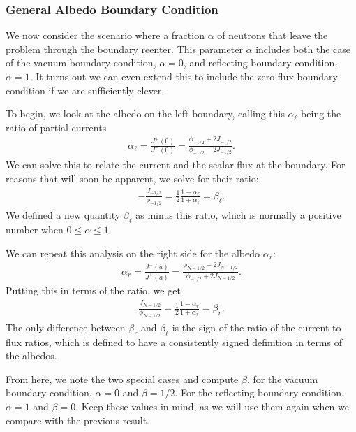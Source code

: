 \subsubsection{General Albedo Boundary Condition}

We now consider the scenario where a fraction $\alpha$ of neutrons that leave the problem through the boundary reenter. This parameter $\alpha$ includes both the case of the vacuum boundary condition, $\alpha = 0$, and reflecting boundary condition, $\alpha = 1$. It turns out we can even extend this to include the zero-flux boundary condition if we are sufficiently clever. 

To begin, we look at the albedo on the left boundary, calling this $\alpha_\ell$ being the ratio of partial currents
\begin{align}
  \alpha_\ell = \frac{ J^+(0) }{ J^-(0) } = \frac{ \phi_{-1/2} + 2 J_{-1/2} }{ \phi_{-1/2} - 2 J_{-1/2} } .
\end{align}
We can solve this to relate the current and the scalar flux at the boundary. For reasons that will soon be apparent, we solve for their ratio:
\begin{align}
  -\frac{J_{-1/2}}{\phi_{-1/2}} = \frac{1}{2} \frac{ 1 - \alpha_\ell }{ 1 + \alpha_\ell } = \beta_\ell . \label{Eq:neutronics_albedoBeta_FiniteDifferenceLeft}
\end{align}
We defined a new quantity $\beta_\ell$ as minus this ratio, which is normally a positive number when $0 \le \alpha \le 1$. 

We can repeat this analysis on the right side for the albedo $\alpha_r$:
\begin{align}
  \alpha_r = \frac{ J^-(a) }{ J^+(a) } = \frac{ \phi_{N-1/2} - 2 J_{N-1/2} }{ \phi_{-1/2} + 2 J_{N-1/2} } .
\end{align}
Putting this in terms of the ratio, we get
\begin{align}
  \frac{J_{N-1/2}}{\phi_{N-1/2}} = \frac{1}{2} \frac{ 1 - \alpha_r }{ 1 + \alpha_r } = \beta_r . \label{Eq:neutronics_albedoBeta_FiniteDifferenceRight}
\end{align}
The only difference between $\beta_r$ and $\beta_\ell$ is the sign of the ratio of the current-to-flux ratios, which is defined to have a consistently signed definition in terms of the albedos.

From here, we note the two special cases and compute $\beta$. for the vacuum boundary condition, $\alpha = 0$ and $\beta = 1/2$. For the reflecting boundary condition, $\alpha = 1$ and $\beta = 0$. Keep these values in mind, as we will use them again when we compare with the previous result.

